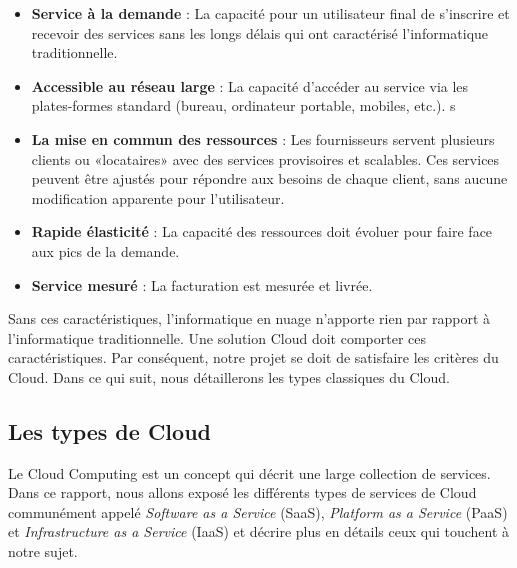 \begin{onehalfspace}
\begin{itemize}

\item \textbf{Service à la demande} : La capacité pour un utilisateur final de s'inscrire et recevoir des services sans les longs délais qui ont caractérisé l'informatique traditionnelle.

\item \textbf{Accessible au réseau large} : La capacité d'accéder au service via les plates-formes standard (bureau, ordinateur portable, mobiles, etc.).
s
\item \textbf{La mise en commun des ressources} : Les fournisseurs servent plusieurs clients ou «locataires» avec des services provisoires et scalables. Ces services peuvent être ajustés pour répondre aux besoins de chaque client, sans aucune modification apparente pour l'utilisateur.

\item \textbf{Rapide élasticité} : La capacité des ressources doit évoluer pour faire face aux pics de la demande.

\item \textbf{Service mesuré} : La facturation est mesurée et livrée.
 	
\end{itemize}


Sans ces caractéristiques, l'informatique en nuage n'apporte rien par rapport à l'informatique traditionnelle. Une solution Cloud doit comporter ces caractéristiques. Par conséquent, notre projet se doit de satisfaire les critères du Cloud. Dans ce qui suit, nous détaillerons les types classiques du Cloud.

\subsection{Les types de Cloud}

Le Cloud Computing est un concept qui décrit une large collection de services. Dans ce rapport, nous allons exposé les différents types de services de Cloud communément appelé \emph{Software as a Service} (SaaS),  \emph{Platform as a Service} (PaaS) et \emph{Infrastructure as a Service} (IaaS) et décrire plus en détails ceux qui touchent à notre sujet.


\end{onehalfspace}
